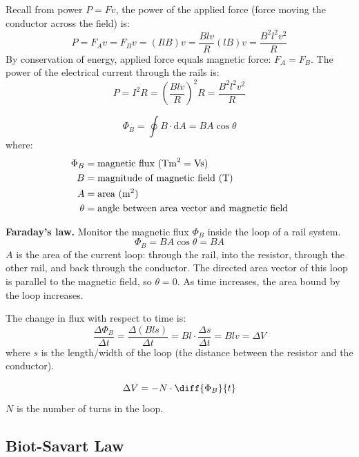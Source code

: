 \documentclass{article}
\newcommand{\theorem}[2]{\begin{tcolorbox}[title={#1},colback=blue!5!white,colframe=blue!75!black,parbox=false] #2 \end{tcolorbox}}
\begin{document}
Recall from power $P=Fv$, the power of the applied force (force moving the conductor across the field) is:
\begin{equation*}
    P
	=F_Av
	=F_Bv
	=(IlB)v
	=\frac{Blv}{R}(lB)v
	=\frac{B^2l^2v^2}{R}
\end{equation*}
By conservation of energy, applied force equals magnetic force: $F_A=F_B$. The power of the electrical current through the rails is:
\begin{equation*}
	P 
	=I^2R
	=\left( \frac{Blv}{R} \right)^2 R
	=\frac{B^2l^2v^2}{R}
\end{equation*}

\theorem{Magnetic flux}{
	\begin{equation*}
	    \Phi_B
		=\oint B\cdot \mathrm{d}A
		=BA\cos\theta
	\end{equation*}
	where:
	\begin{align*}
		\Phi_B&=\text{magnetic flux ($\si{Tm^2}=\si{Vs}$)} \\
		B&=\text{magnitude of magnetic field (T)} \\
		A&=\text{area (\si{m^2})} \\
		\theta&=\text{angle between area vector and magnetic field}
	\end{align*}
}

\textbf{Faraday's law.} Monitor the magnetic flux $\Phi_B$ inside the loop of a rail system.
\begin{equation*}
    \Phi_B
	=BA\cos\theta
	=BA
\end{equation*}
$A$ is the area of the current loop: through the rail, into the resistor, through the other rail, and back through the conductor. The directed area vector of this loop is parallel to the magnetic field, so $\theta=0$. As time increases, the area bound by the loop increases.

The change in flux with respect to time is:
\begin{equation*}
    \frac{\Delta \Phi_B}{\Delta t}
	=\frac{\Delta(Bls)}{\Delta t}
	=Bl\cdot \frac{\Delta s}{\Delta t}
	=Blv
	=\Delta V
\end{equation*}
where $s$ is the length/width of the loop (the distance between the resistor and the conductor).
\theorem{Faraday's law}{
	\begin{equation*}
		\Delta V=-N \cdot \diff{\Phi_B}{t}
	\end{equation*}
	$N$ is the number of turns in the loop.
}

\subsection{Biot-Savart Law}
\end{document}
